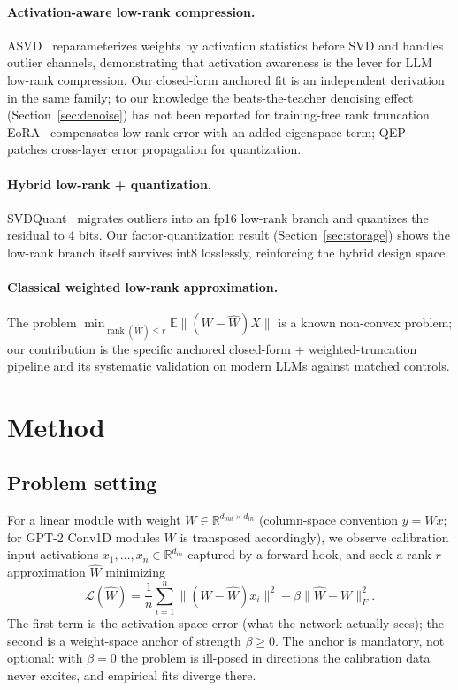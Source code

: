 \documentclass[11pt]{article}
\newcommand{\Wh}{\widehat{W}}
\begin{document}
\paragraph{Activation-aware low-rank compression.} ASVD~\cite{yuan2023asvd}
reparameterizes weights by activation statistics before
SVD and handles outlier channels, demonstrating that activation awareness
is the lever for LLM low-rank compression. Our closed-form anchored fit is
an independent derivation in the same family; to our knowledge the
beats-the-teacher denoising effect (Section~\ref{sec:denoise}) has not been
reported for training-free rank truncation. EoRA~\cite{liu2024eora}
compensates low-rank error with an added eigenspace term;
QEP~\cite{arai2025qep} patches cross-layer error propagation for
quantization.

\paragraph{Hybrid low-rank + quantization.} SVDQuant~\cite{li2024svdquant}
migrates outliers into an fp16 low-rank branch and quantizes the residual
to 4 bits. Our factor-quantization result (Section~\ref{sec:storage}) shows
the low-rank branch itself survives int8 losslessly, reinforcing the hybrid
design space.

\paragraph{Classical weighted low-rank approximation.} The problem
$\min_{\operatorname{rank}(\Wh)\le r} \mathbb{E}\|(W-\Wh)X\|$ is a known
non-convex problem; our contribution is the specific anchored closed-form +
weighted-truncation pipeline and its systematic validation on modern LLMs
against matched controls.

\section{Method}\label{sec:method}

\subsection{Problem setting}
For a linear module with weight $W \in \mathbb{R}^{d_{out}\times d_{in}}$
(column-space convention $y = Wx$; for GPT-2 Conv1D modules $W$ is
transposed accordingly), we observe calibration input activations
$x_1,\dots,x_n \in \mathbb{R}^{d_{in}}$ captured by a forward hook, and
seek a rank-$r$ approximation $\Wh$ minimizing
\begin{equation}\label{eq:obj}
  \mathcal{L}(\Wh) = \frac{1}{n}\sum_{i=1}^{n} \|(W-\Wh)x_i\|^2
                     + \beta \|\Wh - W\|_F^2 .
\end{equation}
The first term is the activation-space error (what the network actually
sees); the second is a weight-space anchor of strength $\beta \ge 0$. The
anchor is mandatory, not optional: with $\beta = 0$ the problem is
ill-posed in directions the calibration data never excites, and empirical
fits diverge there.
\end{document}
